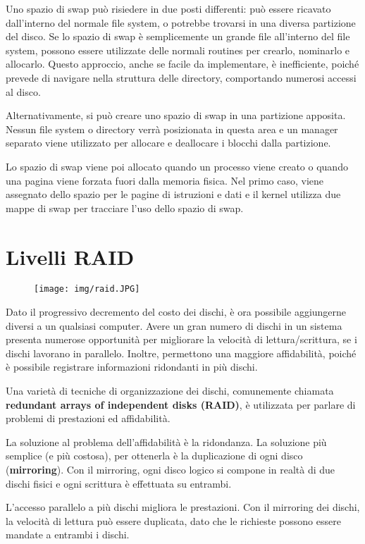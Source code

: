 \documentclass[a4]{article}
\begin{document}
Uno spazio di swap può risiedere in due posti differenti: può essere ricavato dall'interno del normale file system, o potrebbe trovarsi in una diversa partizione del disco. Se lo spazio di swap è semplicemente un grande file all'interno del file system, possono essere utilizzate delle normali routines per crearlo, nominarlo e allocarlo. Questo approccio, anche se facile da implementare, è inefficiente, poiché prevede di navigare nella struttura delle directory, comportando numerosi accessi al disco.

Alternativamente, si può creare uno spazio di swap in una partizione apposita. Nessun file system o directory verrà posizionata in questa area e un manager separato viene utilizzato per allocare e deallocare i blocchi dalla partizione.

Lo spazio di swap viene poi allocato quando un processo viene creato o quando una pagina viene forzata fuori dalla memoria fisica. Nel primo caso, viene assegnato dello spazio per le pagine di istruzioni e dati e il kernel utilizza due mappe di swap per tracciare l'uso dello spazio di swap.


\section{Livelli RAID}

\begin{figure}[h!]
    \centering
    \texttt{[image: img/raid.JPG]}
\end{figure}

Dato il progressivo decremento del costo dei dischi, è ora possibile aggiungerne diversi a un qualsiasi computer. Avere un gran numero di dischi in un sistema presenta numerose opportunità per migliorare la velocità di lettura/scrittura, se i dischi lavorano in parallelo. Inoltre, permettono una maggiore affidabilità, poiché è possibile registrare informazioni ridondanti in più dischi.

Una varietà di tecniche di organizzazione dei dischi, comunemente chiamata \textbf{redundant arrays of independent disks (RAID)}, è utilizzata per parlare di problemi di prestazioni ed affidabilità.

La soluzione al problema dell'affidabilità è la ridondanza. La soluzione più semplice (e più costosa), per ottenerla è la duplicazione di ogni disco (\textbf{mirroring}). Con il mirroring, ogni disco logico si compone in realtà di due dischi fisici e ogni scrittura è effettuata su entrambi.

L'accesso parallelo a più dischi migliora le prestazioni. Con il mirroring dei dischi, la velocità di lettura può essere duplicata, dato che le richieste possono essere mandate a entrambi i dischi.
\end{document}
